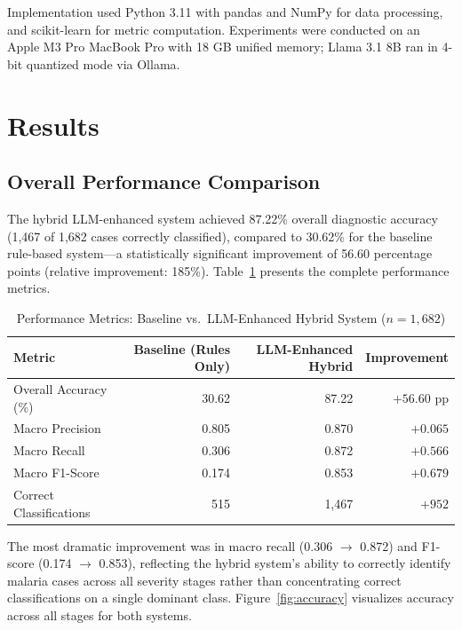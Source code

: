 \documentclass[12pt,a4paper]{article}
\begin{document}
Implementation used Python 3.11 with pandas and NumPy for data processing, and scikit-learn for metric computation. Experiments were conducted on an Apple M3 Pro MacBook Pro with 18 GB unified memory; Llama 3.1 8B ran in 4-bit quantized mode via Ollama.

\section{Results}
\label{sec:results}

\subsection{Overall Performance Comparison}

The hybrid LLM-enhanced system achieved 87.22\% overall diagnostic accuracy (1,467 of 1,682 cases correctly classified), compared to 30.62\% for the baseline rule-based system---a statistically significant improvement of 56.60 percentage points (relative improvement: 185\%). Table~\ref{tab:performance} presents the complete performance metrics.

\begin{table}[H]
\centering
\caption{Performance Metrics: Baseline vs.\ LLM-Enhanced Hybrid System ($n = 1{,}682$)}
\label{tab:performance}
\begin{tabular}{@{}lrrr@{}}
\toprule
\textbf{Metric} & \textbf{Baseline (Rules Only)} & \textbf{LLM-Enhanced Hybrid} & \textbf{Improvement} \\
\midrule
Overall Accuracy (\%)     & 30.62 & 87.22 & $+56.60$ pp \\
Macro Precision           & 0.805 & 0.870 & $+0.065$ \\
Macro Recall              & 0.306 & 0.872 & $+0.566$ \\
Macro F1-Score            & 0.174 & 0.853 & $+0.679$ \\
Correct Classifications   & 515   & 1,467 & $+952$ \\
\bottomrule
\end{tabular}
\end{table}

The most dramatic improvement was in macro recall (0.306 $\to$ 0.872) and F1-score (0.174 $\to$ 0.853), reflecting the hybrid system's ability to correctly identify malaria cases across all severity stages rather than concentrating correct classifications on a single dominant class. Figure~\ref{fig:accuracy} visualizes accuracy across all stages for both systems.
\end{document}
